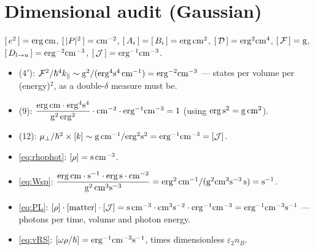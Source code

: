 \documentclass[11pt,a4paper]{article}
\numberwithin{equation}{section}
\begin{document}
\section{Dimensional audit (Gaussian)}\label{app:dim}

$[\,e^2\,]={\rm erg\,cm}$, $[\,|P|^2\,]={\rm cm^{-2}}$,
$[\,A_i\,]=[\,B_i\,]={\rm erg\,cm^2}$, $[\,{\mathcal{D}}\,]={\rm erg^2cm^4}$,
$[\,{\mathcal{F}}\,]={\rm g}$, $[\,{D_{l\to u}}\,]={\rm erg^{-2}cm^{-3}}$,
$[\,{\mathcal{J}}\,]={\rm erg^{-1}cm^{-3}}$.
\begin{itemize}
\item ($4'$): ${\mathcal{F}}^2/\hbar^4{k_{\parallel}}\sim {\rm g^2}/({\rm erg^4s^4\,cm^{-1}})={\rm erg^{-2}cm^{-3}}$ --- states per volume per (energy)$^2$, as a double-$\delta$ measure must be. \checkmark
\item (9): $\dfrac{{\rm erg\,cm}\cdot{\rm erg^4s^4}} {{\rm g^2}\,{\rm erg^2}}\cdot{\rm cm^{-2}}\cdot {\rm erg^{-1}cm^{-3}}=1$ (using ${\rm erg\,s^2=g\,cm^2}$). \checkmark
\item (12): $\mu_\perp/\hbar^2\times[k]\sim {\rm g\,cm^{-1}}/{\rm erg^2s^2}={\rm erg^{-1}cm^{-3}}=[{\mathcal{J}}]$. \checkmark
\item \eqref{eq:rhophot}: $[\rho]={\rm s\,cm^{-3}}$. \checkmark
\item \eqref{eq:Wsp}: $\dfrac{{\rm erg\,cm}\cdot{\rm s^{-1}}\cdot {\rm erg\,s}\cdot{\rm cm^{-2}}}{{\rm g^2\,cm^3s^{-3}}} ={\rm erg^2\,cm^{-1}}/({\rm g^2cm^3s^{-3}}\,{\rm s}) ={\rm s^{-1}}$. \checkmark
\item \eqref{eq:PL}: $[\rho]\cdot[\text{matter}]\cdot[{\mathcal{J}}] ={\rm s\,cm^{-3}}\cdot{\rm cm^3s^{-2}}\cdot{\rm erg^{-1}cm^{-3}} ={\rm erg^{-1}cm^{-3}s^{-1}}$ --- photons per time, volume and photon energy. \checkmark
\item \eqref{eq:vRS}: $[\omega\rho/\hbar] ={\rm erg^{-1}cm^{-3}s^{-1}}$, times dimensionless ${\varepsilon}_2n_B$. \checkmark
\end{itemize}
\end{document}
